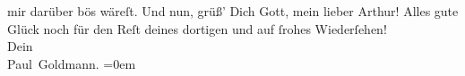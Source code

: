 \begin{ledgroupsized}[t]{13cm}
               mir darüber bös wäreſt.\pend
           \pstart
           Und nun, grüß’ Dich Gott, mein lieber Arthur! Alles gute Glück noch für den Reſt
               deines dortigen \label{K_L02651-9v}\label{K_L02651-9h} und {\pb}auf ſrohes Wiederſehen! {\\[\baselineskip]}Dein {\\[\baselineskip]}\spacefill\mbox{Paul Goldmann.}\pend
           \leftskip=0em{}
         
         \endnumbering{}\end{ledgroupsized}  \newcommand{\dateiname}{L02651}\newcommand{\titel}{Paul Goldmann an Arthur Schnitzler, 1. 10. 1890}\newcommand{\editorInnen}{Martin Anton Müller und Laura Untner}
      